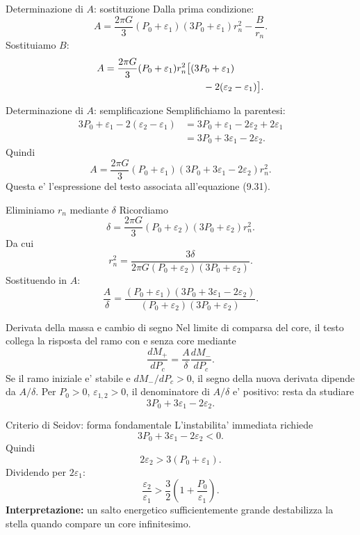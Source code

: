 \begin{frame}{Determinazione di $A$: sostituzione}
\small
Dalla prima condizione:
\[
A=\frac{2\pi G}{3}(P_0+\varepsilon_1)
(3P_0+\varepsilon_1)r_n^2-\frac{B}{r_n}.
\]
Sostituiamo $B$:
\[
\begin{aligned}
A={}&\frac{2\pi G}{3}(P_0+\varepsilon_1)r_n^2
\big[(3P_0+\varepsilon_1)\\
&\hspace{31mm}-2(\varepsilon_2-\varepsilon_1)\big].
\end{aligned}
\]
\end{frame}

\begin{frame}{Determinazione di $A$: semplificazione}
\small
Semplifichiamo la parentesi:
\[
\begin{aligned}
3P_0+\varepsilon_1-2(\varepsilon_2-\varepsilon_1)
&=3P_0+\varepsilon_1-2\varepsilon_2+2\varepsilon_1\\
&=3P_0+3\varepsilon_1-2\varepsilon_2.
\end{aligned}
\]
Quindi
\[
{
A=\frac{2\pi G}{3}(P_0+\varepsilon_1)
(3P_0+3\varepsilon_1-2\varepsilon_2)r_n^2.}
\]
Questa e' l'espressione del testo associata all'equazione (9.31).
\end{frame}

\begin{frame}{Eliminiamo $r_n$ mediante $\delta$}
\small
Ricordiamo
\[
\delta=\frac{2\pi G}{3}
(P_0+\varepsilon_2)(3P_0+\varepsilon_2)r_n^2.
\]
Da cui
\[
r_n^2=\frac{3\delta}{2\pi G
(P_0+\varepsilon_2)(3P_0+\varepsilon_2)}.
\]
Sostituendo in $A$:
\[
{\frac{A}{\delta}=
\frac{(P_0+\varepsilon_1)
(3P_0+3\varepsilon_1-2\varepsilon_2)}
{(P_0+\varepsilon_2)(3P_0+\varepsilon_2)}.}
\]
\end{frame}

\begin{frame}{Derivata della massa e cambio di segno}
\small
Nel limite di comparsa del core, il testo collega
la risposta del ramo con e senza core mediante
\[
{
\frac{dM_+}{dP_c}=\frac{A}{\delta}
\frac{dM_-}{dP_c}.}
\]
Se il ramo iniziale e' stabile e $dM_-/dP_c>0$,
il segno della nuova derivata dipende da $A/\delta$.
\medskip
Per $P_0>0$, $\varepsilon_{1,2}>0$, il denominatore
 di $A/\delta$ e' positivo: resta da studiare
\[
3P_0+3\varepsilon_1-2\varepsilon_2.
\]
\end{frame}

\begin{frame}{Criterio di Seidov: forma fondamentale}
\small
L'instabilita' immediata richiede
\[
3P_0+3\varepsilon_1-2\varepsilon_2<0.
\]
Quindi
\[
2\varepsilon_2>3(P_0+\varepsilon_1).
\]
Dividendo per $2\varepsilon_1$:
\[
{
\frac{\varepsilon_2}{\varepsilon_1}>
\frac32\left(1+\frac{P_0}{\varepsilon_1}\right).}
\]
\textbf{Interpretazione:} un salto energetico sufficientemente grande
destabilizza la stella quando compare un core infinitesimo.
\end{frame}

